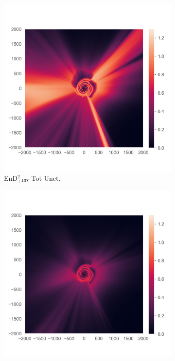 \begin{figure}
\begin{subfigure}{0.22\textwidth}
  \centering
  \includegraphics[trim=42 45 15 55, clip, width=\linewidth]{plots/3g.png}
  \caption{EnD$^2_{\texttt{+AUX}}$ Tot Unct.}
  \label{fig:3g}
\end{subfigure}%
\begin{subfigure}{0.22\textwidth}
  \centering
  \includegraphics[trim=42 45 15 55, clip, width=\linewidth]{plots/3h.png}

\end{subfigure}
\end{figure}

